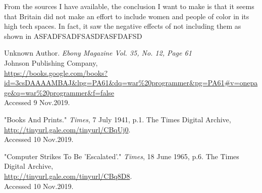 \documentclass[a4paper,12pt]{article}
\begin{document}
From the sources I have available, the conclusion I want to make is that it seems that Britain did not make an effort to include women and people of color in its high tech spaces. In fact, it saw the negative effects of not including them as shown in ASFADFSADFSASDFASFDAFSD

\newpage

\begin{thebibliography}{9}


Unknown Author. \textit{Ebony Magazine Vol. 35, No. 12, Page 61}\\
Johnson Publishing Company, \\
\url{https://books.google.com/books?id=3csDAAAAMBAJ&lpg=PA61&dq=war%20programmer&pg=PA61#v=onepage&q=war%20programmer&f=false} \\
Accessed 9 Nov.2019.

"Books And Prints." \textit{Times}, 7 July 1941, p.1. The Times Digital Archive, \\
\url{http://tinyurl.gale.com/tinyurl/CBqUj0}.\\
Accessed 10 Nov.2019.

"Computer Strikes To Be 'Escalated'." \textit{Times}, 18 June 1965, p.6. The Times Digital Archive,\\
\url{http://tinyurl.gale.com/tinyurl/CBq8D8}. \\
Accessed 10 Nov.2019.


\end{thebibliography}

\newpage

\end{document}
